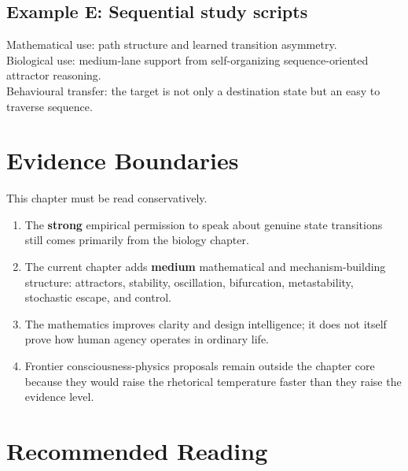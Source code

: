 \subsection*{Example E: Sequential study scripts}

Mathematical use: path structure and learned transition asymmetry.\\
Biological use: medium-lane support from self-organizing sequence-oriented
attractor reasoning.\\
Behavioural transfer: the target is not only a destination state but an easy
to traverse sequence.

\section{Evidence Boundaries}

This chapter must be read conservatively.
\begin{enumerate}[nosep]
  \item The \textbf{strong} empirical permission to speak about genuine state
        transitions still comes primarily from the biology chapter.
  \item The current chapter adds \textbf{medium} mathematical and
        mechanism-building structure: attractors, stability, oscillation,
        bifurcation, metastability, stochastic escape, and control.
  \item The mathematics improves clarity and design intelligence; it does not
        itself prove how human agency operates in ordinary life.
  \item Frontier consciousness-physics proposals remain outside the chapter core
        because they would raise the rhetorical temperature faster than they
        raise the evidence level.
\end{enumerate}

\section{Recommended Reading}

